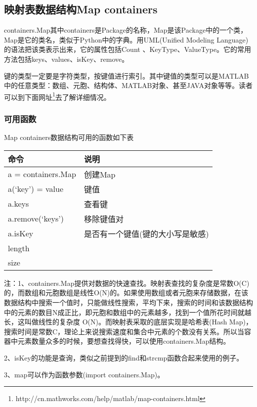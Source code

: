     \subsection{映射表数据结构Map containers}
        \par
        containers.Map其中containers是Package的名称，Map是该Package中的一个类，Map是它的类名，类似于Python中的字典。用UML(Unified Modeling Language)的语法把该类表示出来，它的属性包括Count 、KeyType、ValueType。它的常用方法包括keys、values、isKey、remove。
        \par
        键的类型一定要是字符类型，按键值进行索引。其中键值的类型可以是MATLAB中的任意类型：数组、元胞、结构体、MATLAB对象、甚至JAVA对象等等。读者可以到下面网址\footnote{http://cn.mathworks.com/help/matlab/map-containers.html}去了解详细情况。
        \subsubsection{可用函数}
            \par
            Map containers数据结构可用的函数如下表
            \begin{table}[H]
            \centering
            \begin {tabular}{ll}
                \toprule
                 命令 &  说明\\
                \midrule
            a = containers.Map& 创建Map\\
            a(‘key’) = value  &键值\\
            a.keys& 查看键\\
            a.remove(‘keys’)& 移除键值对\\
            a.isKey &是否有一个键值(键的大小写是敏感)\\
            length  &{}\\
            size  &{}\\
             \bottomrule
            \end{tabular}
            \end{table}
            \noindent
            注：1、containers.Map提供对数据的快速查找。映射表查找的复杂度是常数O(C)的，而数组和元胞数组是线性O(N)的。如果使用数组或者元胞来存储数据，在该数据结构中搜索一个值时，只能做线性搜索，平均下来，搜索的时间和该数据结构中的元素的数目N成正比，即元胞和数组中的元素越多，找到一个值所花时间就越长，这叫做线性的复杂度 O(N)。而映射表采取的底层实现是哈希表(Hash Map)，搜索时间是常数C，理论上来说搜索速度和集合中元素的个数没有关系。所以当容器中元素数量众多的时候，要想查找得快，可以使用containers.Map结构。
            \par
            2、isKey的功能是查询，类似之前提到的find和strcmp函数合起来使用的例子。
            \par
            3、map可以作为函数参数(import containers.Map)。
